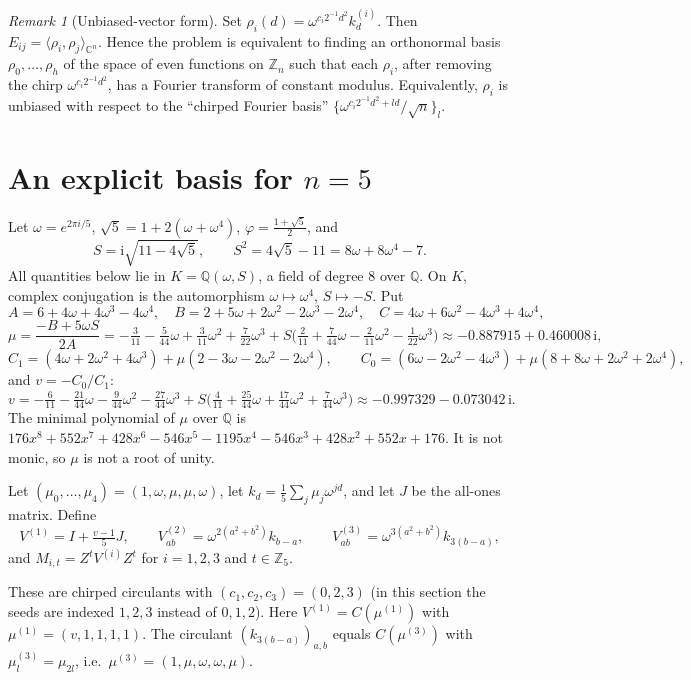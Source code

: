 \documentclass[11pt]{amsart}
\theoremstyle{definition}
\theoremstyle{remark}
\newtheorem{remark}[theorem]{Remark}
\newcommand{\Z}{\mathbb{Z}}
\newcommand{\C}{\mathbb{C}}
\newcommand{\Q}{\mathbb{Q}}
\newcommand{\ip}[2]{\langle #1,#2\rangle}
\begin{document}
\begin{remark}[Unbiased-vector form]\label{rem:mub}
Set $\rho_i(d)=\omega^{c_i2^{-1}d^2}k^{(i)}_d$. Then $E_{ij}=\ip{\rho_i}{\rho_j}_{\C^n}$. Hence the problem is equivalent to finding an orthonormal basis $\rho_0,\dots,\rho_h$ of the space of even functions on $\Z_n$ such that each $\rho_i$, after removing the chirp $\omega^{c_i2^{-1}d^2}$, has a Fourier transform of constant modulus. Equivalently, $\rho_i$ is unbiased with respect to the ``chirped Fourier basis'' $\{\omega^{c_i2^{-1}d^2+ld}/\sqrt n\}_{l}$.
\end{remark}

\section{An explicit basis for \texorpdfstring{$n=5$}{n=5}}\label{sec:n5}

Let $\omega=e^{2\pi i/5}$, $\sqrt5=1+2(\omega+\omega^4)$, $\varphi=\frac{1+\sqrt5}{2}$, and
\[
S=\mathrm i\sqrt{11-4\sqrt5},\qquad S^2=4\sqrt5-11=8\omega+8\omega^4-7 .
\]
All quantities below lie in $K=\Q(\omega,S)$, a field of degree $8$ over $\Q$. On $K$, complex conjugation is the automorphism $\omega\mapsto\omega^4$, $S\mapsto -S$. Put
\[
A=6+4\omega+4\omega^3-4\omega^4,\quad
B=2+5\omega+2\omega^2-2\omega^3-2\omega^4,\quad
C=4\omega+6\omega^2-4\omega^3+4\omega^4,
\]
\[
\mu=\frac{-B+5\omega S}{2A}
=-\tfrac{3}{11}-\tfrac{5}{44}\omega+\tfrac{3}{11}\omega^2+\tfrac{7}{22}\omega^3
+S\Big(\tfrac{2}{11}+\tfrac{7}{44}\omega-\tfrac{2}{11}\omega^2-\tfrac{1}{22}\omega^3\Big)\approx-0.887915+0.460008\,\mathrm i ,
\]
\[
C_1=(4\omega+2\omega^2+4\omega^3)+\mu(2-3\omega-2\omega^2-2\omega^4),\qquad
C_0=(6\omega-2\omega^2-4\omega^3)+\mu(8+8\omega+2\omega^2+2\omega^4),
\]
and $v=-C_0/C_1$:
\[
v=-\tfrac{6}{11}-\tfrac{21}{44}\omega-\tfrac{9}{44}\omega^2-\tfrac{27}{44}\omega^3
+S\Big(\tfrac{4}{11}+\tfrac{25}{44}\omega+\tfrac{17}{44}\omega^2+\tfrac{7}{44}\omega^3\Big)\approx-0.997329-0.073042\,\mathrm i .
\]
The minimal polynomial of $\mu$ over $\Q$ is $176x^8+552x^7+428x^6-546x^5-1195x^4-546x^3+428x^2+552x+176$. It is not monic, so $\mu$ is not a root of unity.

Let $(\mu_0,\dots,\mu_4)=(1,\omega,\mu,\mu,\omega)$, let $k_d=\frac15\sum_j\mu_j\omega^{jd}$, and let $J$ be the all-ones matrix. Define
\[
V^{(1)}=I+\tfrac{v-1}{5}J,\qquad V^{(2)}_{ab}=\omega^{2(a^2+b^2)}k_{b-a},\qquad V^{(3)}_{ab}=\omega^{3(a^2+b^2)}k_{3(b-a)},
\]
and $M_{i,t}=Z^tV^{(i)}Z^t$ for $i=1,2,3$ and $t\in\Z_5$.

These are chirped circulants with $(c_1,c_2,c_3)=(0,2,3)$ (in this section the seeds are indexed $1,2,3$ instead of $0,1,2$). Here $V^{(1)}=C(\mu^{(1)})$ with $\mu^{(1)}=(v,1,1,1,1)$. The circulant $(k_{3(b-a)})_{a,b}$ equals $C(\mu^{(3)})$ with $\mu^{(3)}_l=\mu_{2l}$, i.e.\ $\mu^{(3)}=(1,\mu,\omega,\omega,\mu)$.
\end{document}
